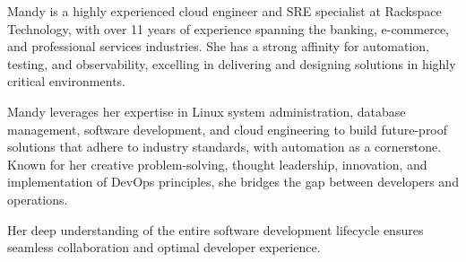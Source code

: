
\begin{cvparagraph}
Mandy is a highly experienced cloud engineer and SRE specialist at Rackspace Technology, with over 11 years of experience spanning the banking, e-commerce, and professional services industries. 
She has a strong affinity for automation, testing, and observability, excelling in delivering and designing solutions in highly critical environments. 

Mandy leverages her expertise in Linux system administration, database management, software development, 
and cloud engineering to build future-proof solutions that adhere to industry standards, with automation as a cornerstone. 
Known for her creative problem-solving, thought leadership, innovation, and implementation of DevOps principles, she bridges the gap between developers and operations. 

Her deep understanding of the entire software development lifecycle ensures seamless collaboration and optimal developer experience.
\end{cvparagraph}

